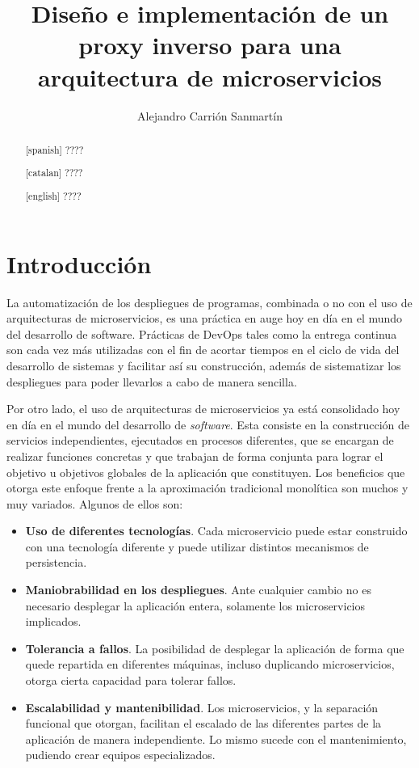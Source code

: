 \documentclass[11pt,spanish,listoffigures]{tfgetsinf}
\title{Diseño e implementación de un proxy inverso para una arquitectura de microservicios}
\author{Alejandro Carrión Sanmartín}
\begin{document}

\begin{abstract}[spanish]
????
\end{abstract}
\begin{abstract}[catalan]
????
\end{abstract}
\begin{abstract}[english]
????
\end{abstract}

\mainmatter


\chapter{Introducción}

La automatización de los despliegues de programas, combinada o no con el uso de arquitecturas de microservicios, es una práctica en auge hoy en día en el mundo del desarrollo de software. Prácticas de DevOps tales como la entrega continua son cada vez más utilizadas con el fin de acortar tiempos en el ciclo de vida del desarrollo de sistemas y facilitar así su construcción, además de sistematizar los despliegues para poder llevarlos a cabo de manera sencilla.

Por otro lado, el uso de arquitecturas de microservicios ya está consolidado hoy en día en el mundo del desarrollo de \emph{software}. Esta consiste en la construcción de servicios independientes, ejecutados en procesos diferentes, que se encargan de realizar funciones concretas y que trabajan de forma conjunta para lograr el objetivo u objetivos globales de la aplicación que constituyen. Los beneficios que otorga este enfoque frente a la aproximación tradicional monolítica son muchos y muy variados. Algunos de ellos son:

\begin{itemize}

\item \textbf{Uso de diferentes tecnologías}.
Cada microservicio puede estar construido con una tecnología diferente y puede utilizar distintos mecanismos de persistencia.

\item \textbf{Maniobrabilidad en los despliegues}.
Ante cualquier cambio no es necesario desplegar la aplicación entera, solamente los microservicios implicados.

\item \textbf{Tolerancia a fallos}.
La posibilidad de desplegar la aplicación de forma que quede repartida en diferentes máquinas, incluso duplicando microservicios, otorga cierta capacidad para tolerar fallos.

\item \textbf{Escalabilidad y mantenibilidad}.
Los microservicios, y la separación funcional que otorgan, facilitan el escalado de las diferentes partes de la aplicación de manera independiente. Lo mismo sucede con el mantenimiento, pudiendo crear equipos especializados.

\end{itemize}
\end{document}
